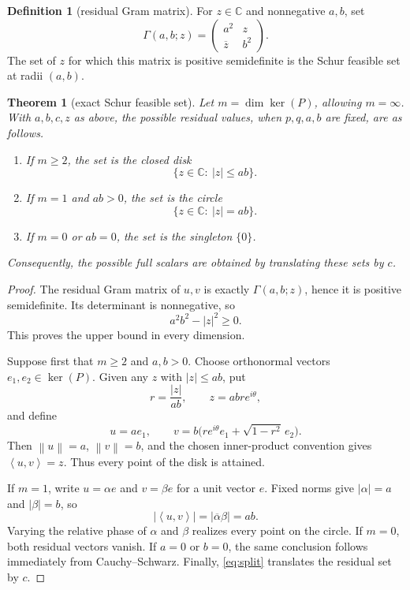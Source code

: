 \documentclass[11pt]{article}
\newtheorem{theorem}{Theorem}
\theoremstyle{definition}
\newtheorem{definition}{Definition}
\newcommand{\ip}[2]{\left\langle #1,#2\right\rangle}
\newcommand{\norm}[1]{\left\lVert #1\right\rVert}
\newcommand{\C}{\mathbb C}
\begin{document}
\begin{definition}[residual Gram matrix]
For $z\in\C$ and nonnegative $a,b$, set
\[
 \Gamma(a,b;z)=
 \begin{pmatrix}
  a^2 & z\\
  \overline z & b^2
 \end{pmatrix}.
\]
The set of $z$ for which this matrix is positive semidefinite is the Schur
feasible set at radii $(a,b)$.
\end{definition}

\begin{theorem}[exact Schur feasible set]
Let $m=\dim\ker(P)$, allowing $m=\infty$.  With $a,b,c,z$ as above, the
possible residual values, when $p,q,a,b$ are fixed, are as follows.
\begin{enumerate}
 \item If $m\geq2$, the set is the closed disk
 \[
       \{z\in\C:\ |z|\leq ab\}.
 \]
 \item If $m=1$ and $ab>0$, the set is the circle
 \[
       \{z\in\C:\ |z|=ab\}.
 \]
 \item If $m=0$ or $ab=0$, the set is the singleton $\{0\}$.
\end{enumerate}
Consequently, the possible full scalars are obtained by translating these
sets by $c$.
\end{theorem}

\begin{proof}
The residual Gram matrix of $u,v$ is exactly $\Gamma(a,b;z)$, hence it is
positive semidefinite.  Its determinant is nonnegative, so
\[
 a^2b^2-|z|^2\geq0.
 \label{eq:schur}
\]
This proves the upper bound in every dimension.

Suppose first that $m\geq2$ and $a,b>0$.  Choose orthonormal vectors
$e_1,e_2\in\ker(P)$.  Given any $z$ with $|z|\leq ab$, put
\[
 r=\frac{|z|}{ab},\qquad z=ab r e^{i\theta},
\]
and define
\[
 u=a e_1,\qquad
 v=b\bigl(r e^{i\theta}e_1+\sqrt{1-r^2}\,e_2\bigr).
\]
Then $\norm{u}=a$, $\norm{v}=b$, and the chosen inner-product convention gives
\(\ip{u}{v}=z\).  Thus every point of the disk is attained.

If $m=1$, write $u=\alpha e$ and $v=\beta e$ for a unit vector $e$.
Fixed norms give $|\alpha|=a$ and $|\beta|=b$, so
\[
 |\ip{u}{v}|=|\overline\alpha\beta|=ab.
\]
Varying the relative phase of $\alpha$ and $\beta$ realizes every point on
the circle.  If $m=0$, both residual vectors vanish.  If $a=0$ or $b=0$,
the same conclusion follows immediately from Cauchy--Schwarz.  Finally,
\eqref{eq:split} translates the residual set by $c$.
\end{proof}
\end{document}
